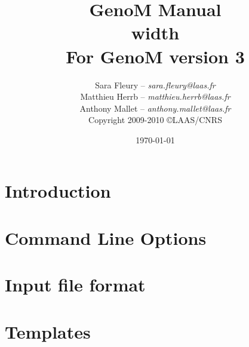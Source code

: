 \documentclass[a4paper,11pt]{book}
\title{\Huge GenoM Manual\\ \vrule height 2pt width \linewidth\\ \hfill\small For GenoM version 3}
\author{
   Sara Fleury -- {\em sara.fleury@laas.fr}\\
   Matthieu Herrb -- {\em matthieu.herrb@laas.fr}\\
   Anthony Mallet -- {\em anthony.mallet@laas.fr}\\[2em]
   Copyright 2009-2010 \copyright LAAS/CNRS
}
\date{\today}
\begin{document}

\frontmatter
\maketitle
\tableofcontents
\mainmatter

\chapter{Introduction}

\chapter{Command Line Options}
\label{chapter:clo}

\chapter{Input file format}
\label{chapter:iff}
\def\n{\string\n{}}


\chapter{Templates}
\label{chapter:tmpl}
\label{section:tcl}

\end{document}
